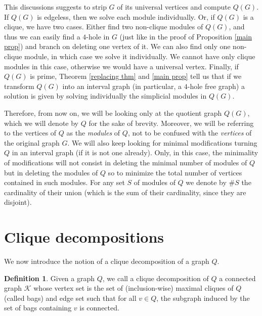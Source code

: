 \documentclass{article}
\theoremstyle{definition}
\newtheorem{defn}[thm]{Definition}
\begin{document}
    This discussions
    suggests to strip $G$ of
    its universal vertices and
    compute $Q\left(G\right)$.
    If $Q\left(G\right)$ is
    edgeless, then we
    solve
    each module individually.
    Or, if $Q\left(G\right)$ is 
    a clique, we have two cases. 
    Either
    find two
    non-clique modules of $Q\left(G\right)$,
    and thus we can easily find
    a $4$-hole in $G$ (just like
    in the proof
    of Proposition \ref{main prop})
    and branch on
    deleting one vertex of it.
    We can also find only one
    non-clique module,
    in which case we solve
    it individually.
    We cannot have only clique
    modules in this case, 
    otherwise we would have
    a universal vertex.
    Finally, if $Q\left(G\right)$
    is prime,
    Theorem \ref{replacing thm} 
    and \ref{main prop}
    tell us that if we
    transform $Q\left(G\right)$ into
    an interval graph (in particular,
    a $4$-hole free graph)
    a solution is given by
    solving individually
    the simplicial modules
    in $Q\left(G\right)$. 
    
    Therefore, from
    now on, we will be looking
    only at the quotient graph $Q\left(G\right)$,
    which we will denote by $Q$ 
    for the sake of brevity.
    Moreover, we will be referring
    to the vertices of $Q$ as the
    \emph{modules} of $Q$,
    not to be confused with the 
    \emph{vertices} of the
    original graph $G$.
    We will also keep
    looking for
    minimal modifications
    turning $Q$ in an
    interval graph (if it is not
    one already). Only,
    in this case, 
    the minimality
    of modifications will
    not consist in deleting
    the minimal number of modules
    of $Q$ but in deleting
    the modules of $Q$ so
    to minimize the total
    number of vertices
    contained in such
    modules.
    For any set $S$ of modules of $Q$ 
    we denote by $\#S$ the cardinality
    of their union (which is the
    sum of their cardinality,
    since they are disjoint).

    \section{Clique decompositions}

    We now introduce the notion of
    a clique decomposition of a graph $Q$.

    \begin{defn}
        Given a graph $Q$, we call
        a clique decomposition of $Q$ a 
        connected graph $\mathcal{K}$ whose vertex set
        is the set of (inclusion-wise)
        maximal cliques of $Q$ (called bags) and
        edge set such that for all
        $v \in Q$, the subgraph
        induced by the set of bags containing
        $v$ is connected.
    \end{defn}
\end{document}
